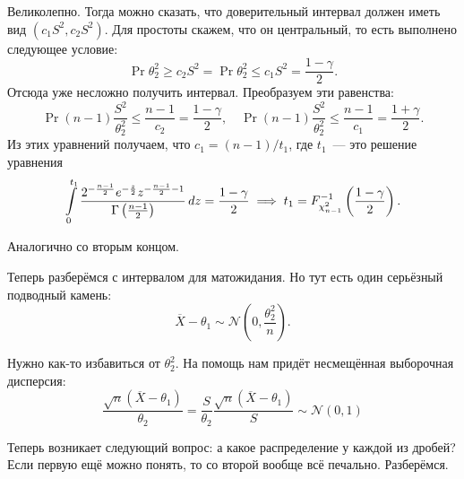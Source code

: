 Великолепно. Тогда можно сказать, что доверительный интервал должен иметь вид 
\((c_{1}S^{2}, c_{2}S^{2})\). Для простоты скажем, что он центральный, то есть выполнено 
следующее условие:
\[
    \Pr{\theta_{2}^{2} \geq c_{2}S^{2}} = \Pr{\theta_{2}^{2} \leq c_{1}S^{2}} = \frac{1 
    - \gamma}{2}.
\]
Отсюда уже несложно получить интервал. Преобразуем эти равенства:
\[
    \Pr{(n - 1)\frac{S^{2}}{\theta_{2}^{2}} \leq \frac{n - 1}{c_{2}}} = \frac{1 - 
    \gamma}{2}, \quad \Pr{(n - 1)\frac{S^{2}}{\theta_{2}^{2}} \leq \frac{n - 1}{c_{1}}} = 
    \frac{1 + \gamma}{2}.
\]
Из этих уравнений получаем, что \(c_{1} = (n - 1)/t_{1}\), где \(t_{1}\)~--- это решение 
уравнения
\[
    \int\limits_{0}^{t_{1}} \frac{2^{-\frac{n - 1}{2}}e^{-\frac{z}{2}}z^{-\frac{n - 1}{2} 
    - 1}}{\Gamma\left(\frac{n - 1}{2}\right)}\mathop{}\!d z = \frac{1 - \gamma}{2} \implies 
    t_{1} = F_{\chi^{2}_{n - 1}}^{-1}\left(\frac{1 - \gamma}{2}\right).
\]

Аналогично со вторым концом. 

Теперь разберёмся с интервалом для матожидания. Но тут есть один серьёзный подводный 
камень:
\[
    \overline{X} - \theta_{1} \sim \mathcal{N}\left(0, \frac{\theta_{2}^{2}}{n}\right). 
\]

Нужно как-то избавиться от \(\theta_{2}^{2}\). На помощь нам придёт несмещённая 
выборочная дисперсия:
\[
    \frac{\sqrt{n}(\overline{X} - \theta_{1})}{\theta_{2}} = \frac{S}{\theta_{2}} 
    \frac{\sqrt{n}(\overline{X} - \theta_{1})}{S} \sim \mathcal{N}(0, 1)
\]

Теперь возникает следующий вопрос: а какое распределение у каждой из дробей? Если первую 
ещё можно понять, то со второй вообще всё печально. Разберёмся.

